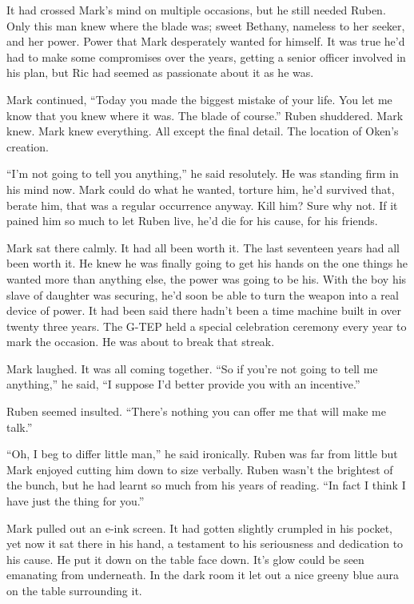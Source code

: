 It had crossed Mark's mind on multiple occasions, but he still needed Ruben.  Only this man knew where the blade was; sweet Bethany, nameless to her seeker, and her power.  Power that Mark desperately wanted for himself.  It was true he'd had to make some compromises over the years, getting a senior officer involved in his plan, but Ric had seemed as passionate about it as he was.

Mark continued, ``Today you made the biggest mistake of your life.  You let me know that you knew where it was.  The blade of course.''  Ruben shuddered.  Mark knew.  Mark knew everything.  All except the final detail.  The location of Oken's creation.  

``I'm not going to tell you anything,'' he said resolutely.  He was standing firm in his mind now.  Mark could do what he wanted, torture him, he'd survived that, berate him, that was a regular occurrence anyway.  Kill him?  Sure why not.  If it pained him so much to let Ruben live, he'd die for his cause, for his friends.  

Mark sat there calmly.  It had all been worth it.  The last seventeen years had all been worth it.  He knew he was finally going to get his hands on the one things he wanted more than anything else, the power was going to be his.  With the boy his slave of daughter was securing, he'd soon be able to turn the weapon into a real device of power.  It had been said there hadn't been a time machine built in over twenty three years.  The G-TEP held a special celebration ceremony every year to mark the occasion.  He was about to break that streak.  

Mark laughed.  It was all coming together.  ``So if you're not going to tell me anything,'' he said, ``I suppose I'd better provide you with an incentive.''

Ruben seemed insulted.  ``There's nothing you can offer me that will make me talk.''

``Oh, I beg to differ little man,'' he said ironically.  Ruben was far from little but Mark enjoyed cutting him down to size verbally.  Ruben wasn't the brightest of the bunch, but he had learnt so much from his years of reading.  ``In fact I think I have just the thing for you.''  

Mark pulled out an e-ink screen.  It had gotten slightly crumpled in his pocket, yet now it sat there in his hand, a testament to his seriousness and dedication to his cause.  He put it down on the table face down.  It's glow could be seen emanating from underneath.  In the dark room it let out a nice greeny blue aura on the table surrounding it.

